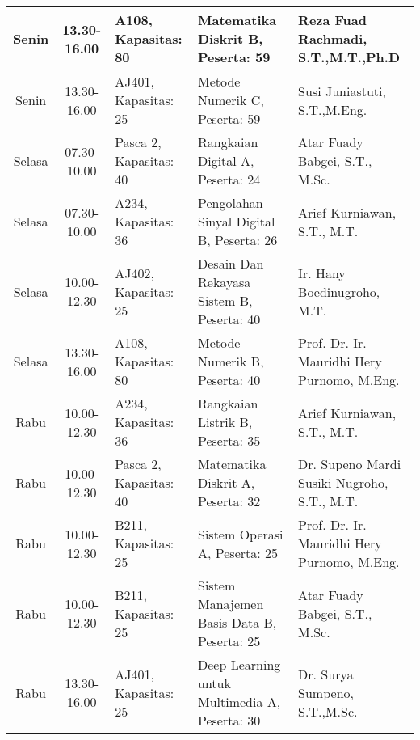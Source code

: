 \begin{longtable}[c]{|c|c|>{\centering\arraybackslash}m{2.5cm}|>{\centering\arraybackslash}m{4cm}|>{\centering\arraybackslash}m{3cm}|}
  Senin  & 13.30-16.00 & A108, Kapasitas: 80    & Matematika Diskrit B, \linebreak Peserta: 59                        & Reza Fuad Rachmadi, S.T.,M.T.,Ph.D            \\ \hline
  Senin  & 13.30-16.00 & AJ401, Kapasitas: 25   & Metode Numerik C, \linebreak Peserta: 59                            & Susi Juniastuti, S.T.,M.Eng.                  \\ \hline
  Selasa & 07.30-10.00 & Pasca 2, Kapasitas: 40 & Rangkaian Digital A, \linebreak Peserta: 24                         & Atar Fuady Babgei, S.T., M.Sc.                \\ \hline
  Selasa & 07.30-10.00 & A234, Kapasitas: 36    & Pengolahan Sinyal Digital B, \linebreak Peserta: 26                 & Arief Kurniawan, S.T., M.T.                   \\ \hline
  Selasa & 10.00-12.30 & AJ402, Kapasitas: 25   & Desain Dan Rekayasa Sistem B, \linebreak Peserta: 40                & Ir. Hany Boedinugroho, M.T.                   \\ \hline
  Selasa & 13.30-16.00 & A108, Kapasitas: 80    & Metode Numerik B, \linebreak Peserta: 40                            & Prof. Dr. Ir. Mauridhi Hery Purnomo, M.Eng.   \\ \hline
  Rabu   & 10.00-12.30 & A234, Kapasitas: 36    & Rangkaian Listrik B, \linebreak Peserta: 35                         & Arief Kurniawan, S.T., M.T.                   \\ \hline
  Rabu   & 10.00-12.30 & Pasca 2, Kapasitas: 40 & Matematika Diskrit A, \linebreak Peserta: 32                        & Dr. Supeno Mardi Susiki Nugroho, S.T., M.T.   \\ \hline
  Rabu   & 10.00-12.30 & B211, Kapasitas: 25    & Sistem Operasi A, \linebreak Peserta: 25                            & Prof. Dr. Ir. Mauridhi Hery Purnomo, M.Eng.   \\ \hline
  Rabu   & 10.00-12.30 & B211, Kapasitas: 25    & Sistem Manajemen Basis Data B, \linebreak Peserta: 25               & Atar Fuady Babgei, S.T., M.Sc.                \\ \hline
  Rabu   & 13.30-16.00 & AJ401, Kapasitas: 25   & Deep Learning untuk Multimedia A, \linebreak Peserta: 30            & Dr. Surya Sumpeno, S.T.,M.Sc.                 \\ \hline

\end{longtable}
